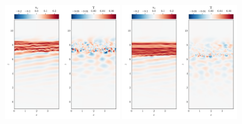 \documentclass[
        fleqn,
        usenatbib,
        referee,
    ]{mnras}
\begin{document}
\begin{figure}
    \includegraphics[width=0.45\textwidth]{plots/yubo_000054.png}\hfil
    \includegraphics[width=0.45\textwidth]{plots/yubo_000086.png}


\end{figure}
\end{document}
